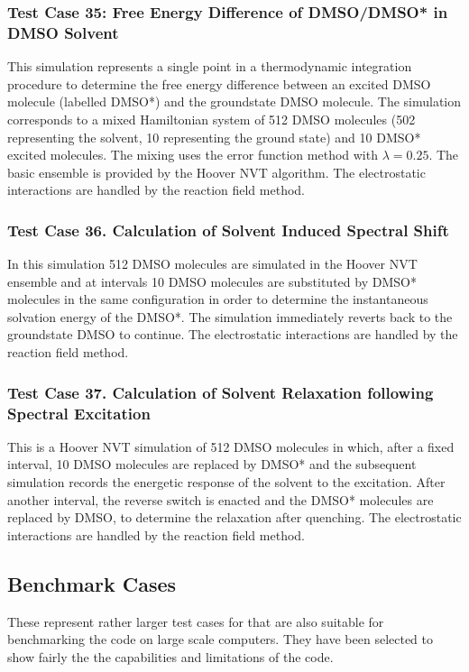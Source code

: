 \subsubsection{Test Case 35: Free Energy Difference of DMSO/DMSO* in DMSO Solvent}
This simulation represents a single point in a thermodynamic integration
procedure to determine the free energy difference between an excited DMSO
molecule (labelled DMSO*) and the groundstate DMSO molecule. The simulation
corresponds to a mixed Hamiltonian system of 512 DMSO molecules (502
representing the solvent, 10 representing the ground state) and 10 DMSO*
excited molecules. The mixing uses the error function method with
$\lambda=0.25$. The basic ensemble is provided by the Hoover NVT algorithm.
The electrostatic interactions are handled by the reaction field method.

\subsubsection{Test Case 36. Calculation of Solvent Induced Spectral Shift}
In this simulation 512 DMSO molecules are simulated in the Hoover NVT ensemble
and at intervals 10 DMSO molecules are substituted by DMSO* molecules in the
same configuration in order to determine the instantaneous solvation energy of
the DMSO*. The simulation immediately reverts back to the groundstate DMSO to
continue. The electrostatic interactions are handled by the reaction field method.

\subsubsection{Test Case 37. Calculation of Solvent Relaxation following
  Spectral Excitation}
This is a Hoover NVT simulation of 512 DMSO molecules in which, after a fixed
interval, 10 DMSO molecules are replaced by DMSO* and the subsequent
simulation records the energetic response of the solvent to the excitation.
After another interval, the reverse switch is enacted and the DMSO* molecules
are replaced by DMSO, to determine the relaxation after quenching.
The electrostatic interactions are handled by the reaction field method.

\subsection{Benchmark Cases}

These represent rather larger test cases for \D{} that are also suitable
for benchmarking the code on large scale computers. They have been
selected to show fairly the the capabilities and limitations of the
code.

